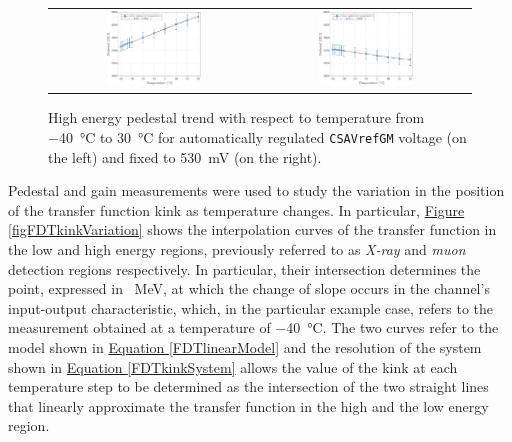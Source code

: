 \begin{figure}[h!]
    \centering
    \begin{tabular}{cc}
        \includegraphics[width=0.475\textwidth]{Images/chap1/results/gain_pedestal/high_energy_pedestal_auto_0011.pdf} & \includegraphics[width=0.475\textwidth]{Images/chap1/results/gain_pedestal/high_energy_pedestal_530mV.pdf}\\
    \end{tabular}
    \caption{High energy pedestal trend with respect to temperature from \SI{-40}{\celsius} to \SI{30}{\celsius} for automatically regulated \texttt{CSAVrefGM} voltage (on the left) and fixed to \SI{530}{\milli\volt} (on the right).}
    \label{figFDTpedestalHighEnergies}
\end{figure}

\par
Pedestal and gain measurements were used to study the variation in the position of the transfer function kink as temperature changes. In particular, \hyperref[figFDTkinkVariation]{Figure \ref{figFDTkinkVariation}} shows the interpolation curves of the transfer function in the low and high energy regions, previously referred to as \textit{X-ray} and \textit{muon} detection regions respectively. In particular, their intersection determines the point, expressed in \SI{}{\mega\electronvolt}, at which the change of slope occurs in the channel's input-output characteristic, which, in the particular example case, refers to the measurement obtained at a temperature of \SI{-40}{\celsius}. The two curves refer to the model shown in \hyperref[FDTlinearModel]{Equation \ref{FDTlinearModel}} and the resolution of the system shown in \hyperref[FDTkinkSystem]{Equation \ref{FDTkinkSystem}} allows the value of the kink at each temperature step to be determined as the intersection of the two straight lines that linearly approximate the transfer function in the high and the low energy region.

